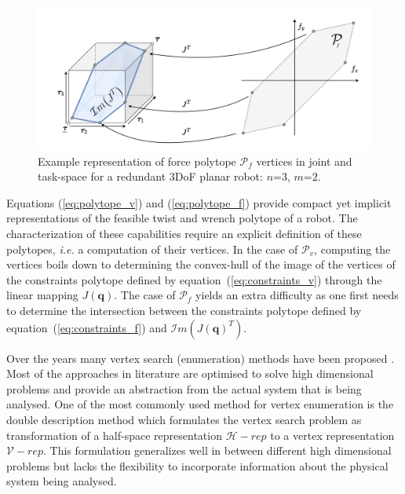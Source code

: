 
\begin{figure}[!t]
    \centering
    \includegraphics[width=\linewidth]{Papers/images/polytope_search.pdf}
    \caption{Example representation of force polytope $\mathcal{P}_f$ vertices in joint and task-space for a redundant 3DoF planar robot: $n$=$3$, $m$=$2$. }
    \label{fig:polytope_search}
\end{figure}

Equations (\ref{eq:polytope_v}) and (\ref{eq:polytope_f}) provide compact yet implicit representations of the feasible twist and wrench polytope of a robot. The characterization of these capabilities require an explicit definition of these polytopes, \textit{i.e.} a computation of their vertices. In the case of $\mathcal{P}_v$, computing the vertices boils down to determining the convex-hull of the image of the vertices of the constraints polytope defined by equation~(\ref{eq:constraints_v}) through the linear mapping $J(\bm{q})$. The case of $\mathcal{P}_f$ yields an extra difficulty as one first needs to determine the intersection between the constraints polytope defined by equation~(\ref{eq:constraints_f}) and $\mathcal{I}m(J(\bm{q})^T)$.

Over the years many vertex search (enumeration) methods have been proposed \cite{avis_comparative_2015}. Most of the approaches in literature are optimised to solve high dimensional problems and provide an abstraction from the actual system that is being analysed. One of the most commonly used method for vertex enumeration is the double description method \cite{avis_pivoting_nodate} which formulates the vertex search problem as transformation of a half-space representation $\mathcal{H}-rep$ to a vertex representation $\mathcal{V}-rep$. This formulation generalizes well in between different high dimensional problems but lacks the flexibility to incorporate information about the physical system being analysed. 

